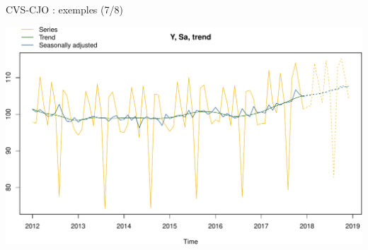 \documentclass[10pt,xcolor=table,color={dvipsnames,usenames},ignorenonframetext,usepdftitle=false,french]{beamer}
\newenvironment{Shaded}{\begin{snugshade}}{\end{snugshade}}
\newcommand{\DataTypeTok}[1]{\textcolor[rgb]{0.13,0.29,0.53}{#1}}
\newcommand{\DecValTok}[1]{\textcolor[rgb]{0.00,0.00,0.81}{#1}}
\newcommand{\KeywordTok}[1]{\textcolor[rgb]{0.13,0.29,0.53}{\textbf{#1}}}
\newcommand{\NormalTok}[1]{#1}
\newcommand{\OperatorTok}[1]{\textcolor[rgb]{0.81,0.36,0.00}{\textbf{#1}}}
\newcommand{\StringTok}[1]{\textcolor[rgb]{0.31,0.60,0.02}{#1}}
\begin{document}
\begin{frame}[fragile]{CVS-CJO : exemples (7/8)}
\protect\hypertarget{cvs-cjo-exemples-78}{}

\begin{Shaded}
\end{Shaded}

\includegraphics{Diapos/1 - R et JDemetra+_files/figure-beamer/unnamed-chunk-19-1.pdf}

\end{frame}
\end{document}
